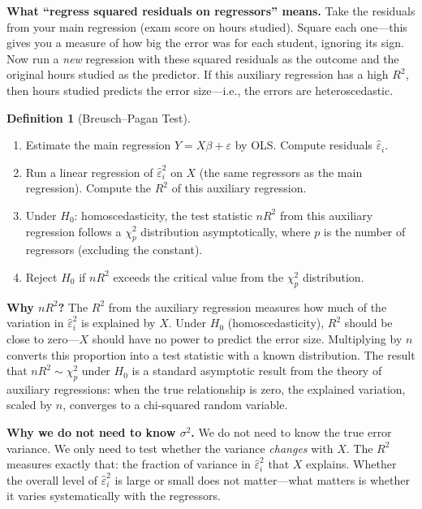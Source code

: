 \documentclass[11pt,a4paper]{article}
\theoremstyle{definition}
\newtheorem{definition}{Definition}[section]
\theoremstyle{plain}
\theoremstyle{remark}
\begin{document}
\textbf{What ``regress squared residuals on regressors'' means.} Take the residuals from your main regression (exam score on hours studied). Square each one---this gives you a measure of how big the error was for each student, ignoring its sign. Now run a \emph{new} regression with these squared residuals as the outcome and the original hours studied as the predictor. If this auxiliary regression has a high $R^2$, then hours studied predicts the error size---i.e., the errors are heteroscedastic.

\begin{definition}[Breusch--Pagan Test]
\begin{enumerate}[nosep]
  \item Estimate the main regression $Y = X\beta + \varepsilon$ by OLS. Compute residuals $\hat\varepsilon_i$.
  \item Run a linear regression of $\hat\varepsilon_i^2$ on $X$ (the same regressors as the main regression). Compute the $R^2$ of this auxiliary regression.
  \item Under $H_0$: homoscedasticity, the test statistic $nR^2$ from this auxiliary regression follows a $\chi^2_p$ distribution asymptotically, where $p$ is the number of regressors (excluding the constant).
  \item Reject $H_0$ if $nR^2$ exceeds the critical value from the $\chi^2_p$ distribution.
\end{enumerate}
\end{definition}

\textbf{Why $nR^2$?} The $R^2$ from the auxiliary regression measures how much of the variation in $\hat\varepsilon_i^2$ is explained by $X$. Under $H_0$ (homoscedasticity), $R^2$ should be close to zero---$X$ should have no power to predict the error size. Multiplying by $n$ converts this proportion into a test statistic with a known distribution. The result that $nR^2 \sim \chi^2_p$ under $H_0$ is a standard asymptotic result from the theory of auxiliary regressions: when the true relationship is zero, the explained variation, scaled by $n$, converges to a chi-squared random variable.

\textbf{Why we do not need to know $\sigma^2$.} We do not need to know the true error variance. We only need to test whether the variance \emph{changes} with $X$. The $R^2$ measures exactly that: the fraction of variance in $\hat\varepsilon_i^2$ that $X$ explains. Whether the overall level of $\hat\varepsilon_i^2$ is large or small does not matter---what matters is whether it varies systematically with the regressors.
\end{document}

